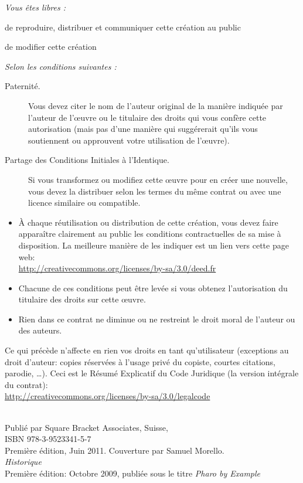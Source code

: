 \documentclass[a4paper,10pt,twoside]{book}
\newcommand{\pbeoriginalcopypublish}{Octobre 2009\xspace} %
\newcommand{\pbeoriginalcopyidx}{Première\xspace} %
\newcommand{\pbecopypublish}{Juin 2011\xspace} %
\newcommand{\pbecopyidx}{Première\xspace} %
\newcommand{\isbnlulu}{978-3-9523341-5-7\xspace}
\begin{document}
\begin{footnotesize}
\emph{Vous \^etes libres :}
\begin{description}
  \item de reproduire, distribuer et communiquer cette création au public
  \item de modifier cette cr\'eation
\end{description}
\emph{Selon les conditions suivantes :}
\begin{description}
  \item[Paternit\'e.] Vous devez citer le nom de l'auteur original de la mani\`ere indiqu\'ee par l'auteur de l'\oe{}uvre ou le titulaire des droits qui vous conf\`ere cette autorisation (mais pas d'une mani\`ere qui sugg\'ererait qu'ils vous soutiennent ou approuvent votre utilisation de l'\oe{}uvre).
  \item[Partage des Conditions Initiales \`a l'Identique.] Si vous transformez ou modifiez cette \oe{}uvre pour en cr\'eer une nouvelle, vous devez la distribuer selon les termes du m\^eme contrat ou avec une licence similaire ou compatible.
\end{description}
\begin{itemize}
  \item \`A chaque r\'eutilisation ou distribution de cette cr\'eation, vous devez faire appara\^itre clairement au public les conditions contractuelles de sa mise \`a disposition. La meilleure mani\`ere de les indiquer est un lien vers cette page web:\\
  \url{http://creativecommons.org/licenses/by-sa/3.0/deed.fr}
  \item Chacune de ces conditions peut \^etre lev\'ee si vous obtenez l'autorisation du titulaire des droits sur cette \oe{}uvre.
  \item Rien dans ce contrat ne diminue ou ne restreint le droit moral de l'auteur ou des auteurs.
\end{itemize}
\quad
\parbox{\textwidth-2cm-1em}{
	Ce qui pr\'ec\`ede n'affecte en rien vos droits en tant qu'utilisateur (exceptions au droit d'auteur: copies r\'eserv\'ees \`a l'usage priv\'e du copiste, courtes citations, parodie, \ldots).
	Ceci est le R\'esum\'e Explicatif du Code Juridique (la version int\'egrale du contrat):\\
\url{http://creativecommons.org/licenses/by-sa/3.0/legalcode}}\\[1cm]
Publié par Square Bracket Associates, Suisse, \sba\\
ISBN \isbnlulu\\
\pbecopyidx édition, \pbecopypublish. Couverture par Samuel Morello.\\[1cm]
\emph{Historique}\\
\pbeoriginalcopyidx édition: \pbeoriginalcopypublish, publiée sous le titre \emph{Pharo by Example}
\end{footnotesize}
\end{document}
